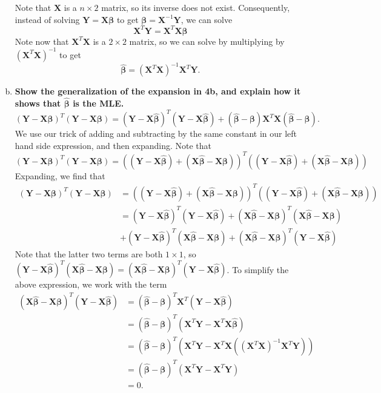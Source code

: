\begin{enumerate}[a)]
Note that $\bm{X}$ is a $n \times 2$ matrix, so its inverse does not exist. Consequently, instead of solving $\bm{Y} = \bm{X\beta}$ to get $\bm{\beta} = \bm{X}^{-1}\bm{Y}$,
we can solve 
\[
    \bm{X}^T \bm{Y} = \bm{X}^T \bm{X} \bm{\beta}
\]
Note now that $\bm{X}^T \bm{X}$ is a $2 \times 2$ matrix, so we can solve by multiplying by $(\bm{X}^T \bm{X})^{-1}$ to get
\[
    \boxed{\hat{\bm{\beta}} = (\bm{X}^T \bm{X})^{-1} \bm{X}^T \bm{Y}}.
\]
\item \textbf{Show the generalization of the expansion in 4b, and explain how it shows that $\hat{\bm{\beta}}$ is the MLE.}
\[
    (\bm{Y} - \bm{X\beta})^T(\bm{Y} - \bm{X\beta}) = (\bm{Y} - \bm{X}\hat{\bm{\beta}})^T(\bm{Y} - \bm{X\hat{\bm{\beta}}}) + (\hat{\bm{\beta}} - \bm{\beta})\bm{X}^T\bm{X}(\hat{\bm{\beta}} - \bm{\beta}).
\]
We use our trick of adding and subtracting by the same constant in our left hand side expression, and then expanding. Note that
\[
    (\bm{Y} - \bm{X\beta})^T(\bm{Y} - \bm{X\beta}) =  ((\bm{Y} - \bm{X}\hat{\bm{\beta}}) + (\bm{X}\hat{\bm{\beta}} - \bm{X\beta}))^T((\bm{Y} - \bm{X}\hat{\bm{\beta}}) + (\bm{X}\hat{\bm{\beta}} - \bm{X\beta}))
\]
Expanding, we find that
\begin{align*}
    (\bm{Y} - \bm{X\beta})^T(\bm{Y} - \bm{X\beta}) &=  ((\bm{Y} - \bm{X}\hat{\bm{\beta}}) + (\bm{X}\hat{\bm{\beta}} - \bm{X\beta}))^T((\bm{Y} - \bm{X}\hat{\bm{\beta}}) + (\bm{X}\hat{\bm{\beta}} - \bm{X\beta})) \\
    &= (\bm{Y} - \bm{X}\hat{\bm{\beta}})^T (\bm{Y} - \bm{X}\hat{\bm{\beta}}) + (\bm{X}\hat{\bm{\beta}} - \bm{X}\bm{\beta})^T (\bm{X}\hat{\bm{\beta}} - \bm{X}\bm{\beta}) \\
    &+ (\bm{Y} - \bm{X}\hat{\bm{\beta}})^T (\bm{X}\hat{\bm{\beta}} - \bm{X}\bm{\beta}) + (\bm{X}\hat{\bm{\beta}} - \bm{X}\bm{\beta})^T(\bm{Y} - \bm{X}\hat{\bm{\beta}})
\end{align*}
Note that the latter two terms are both $1 \times 1$, so $(\bm{Y} - \bm{X}\hat{\bm{\beta}})^T (\bm{X}\hat{\bm{\beta}} - \bm{X}\bm{\beta}) = (\bm{X}\hat{\bm{\beta}} - \bm{X}\bm{\beta})^T(\bm{Y} - \bm{X}\hat{\bm{\beta}})$.
To simplify the above expression, we work with the term
\begin{align*}
    (\bm{X}\hat{\bm{\beta}} - \bm{X}\bm{\beta})^T(\bm{Y} - \bm{X}\hat{\bm{\beta}}) &= (\hat{\bm{\beta}} - \bm{\beta})^T\bm{X}^T (\bm{Y} - \bm{X}\hat{\bm{\beta}}) \\
    &= (\hat{\bm{\beta}} - \bm{\beta})^T (\bm{X}^T\bm{Y} - \bm{X}^T\bm{X}\hat{\bm{\beta}}) \\
    &=  (\hat{\bm{\beta}} - \bm{\beta})^T (\bm{X}^T\bm{Y} - \bm{X}^T\bm{X}((\bm{X}^T\bm{X})^{-1}\bm{X}^T \bm{Y})) \\
    &=  (\hat{\bm{\beta}} - \bm{\beta})^T (\bm{X}^T\bm{Y} - \bm{X}^T \bm{Y}) \\
    &= 0. 
\end{align*}


\end{enumerate}

